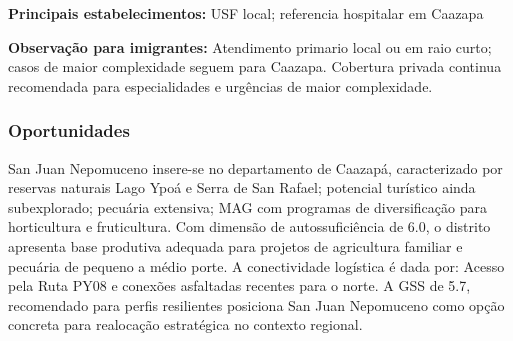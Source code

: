 \textbf{Principais estabelecimentos:} USF local; referencia hospitalar
em Caazapa

\textbf{Observação para imigrantes:} Atendimento primario local ou em
raio curto; casos de maior complexidade seguem para Caazapa. Cobertura
privada continua recomendada para especialidades e urgências de maior
complexidade.
\newpage

\subsubsection*{Oportunidades}\label{oport-san-juan-nepomuceno-0607}
San Juan Nepomuceno insere-se no departamento de Caazapá, caracterizado por reservas naturais Lago Ypoá e Serra de San Rafael; potencial turístico ainda subexplorado; pecuária extensiva; MAG com programas de diversificação para horticultura e fruticultura. Com dimensão de autossuficiência de 6.0, o distrito apresenta base produtiva adequada para projetos de agricultura familiar e pecuária de pequeno a médio porte. A conectividade logística é dada por: Acesso pela Ruta PY08 e conexões asfaltadas recentes para o norte. A GSS de 5.7, recomendado para perfis resilientes posiciona San Juan Nepomuceno como opção concreta para realocação estratégica no contexto regional.

